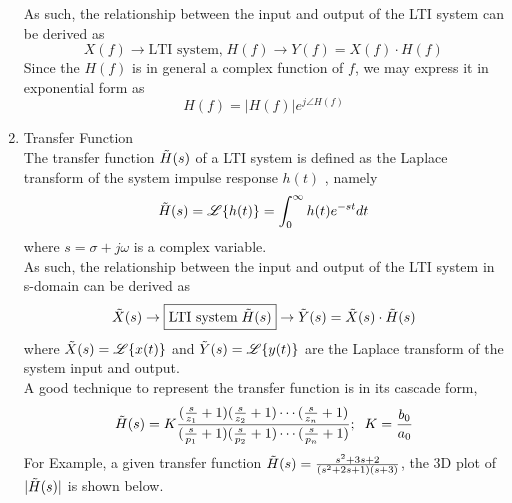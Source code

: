 \documentclass{article}
\begin{document}
\begin{enumerate}
    As such, the relationship between the input and output of the LTI system can be derived as
    \[X(f)\rightarrow\boxed{\text{LTI system,}\;H(f)}\rightarrow Y(f) = X(f)\cdot H(f)\]
    Since the $H(f)$ is in general a complex function of $f$, we may express it in exponential form as 
    \[H(f) = |H(f)|e^{j\angle H(f)}\]
    \item Transfer Function\\
    The transfer function $\Tilde{H}(s)$ of a LTI system is defined as the Laplace transform of the system impulse response $h(t)$ , namely
    \[\Tilde{H}(s) = \mathscr{L}\{h(t)\}=\int^{\infty}_0h(t)e^{-st}dt\]
    where $s = \sigma + j\omega$ is a complex variable.\\
    As such, the relationship between the input and output of the LTI system in s-domain can be derived as
    \[\Tilde{X}(s)\rightarrow\boxed{\text{LTI system}\;\Tilde{H}(s)}\rightarrow\Tilde{Y}(s)=\Tilde{X}(s)\cdot\Tilde{H}(s)\]
    where $\Tilde{X}(s) = \mathscr{L}\{x(t)\}$ and $\Tilde{Y}(s) = \mathscr{L}\{y(t)\}$ are the Laplace transform of the system input and output. \\
    A good technique to represent the transfer function is in its cascade form, 
    \[\Tilde{H}(s) = K\frac{(\frac{s}{z_1}+1)(\frac{s}{z_2} +1)\cdots(\frac{s}{z_n}+1)}{(\frac{s}{p_1}+1)(\frac{s}{p_2}+1)\cdots(\frac{s}{p_n}+1)}; \;\;K = \frac{b_0}{a_0}\]
    For Example, a given transfer function $\Tilde{H}(s) = \frac{s^2+3s+2}{(s^2+2s+1)(s+3)}$, the 3D plot of $|\Tilde{H}(s)|$ is shown below.\\
    

\end{enumerate}
\end{document}
